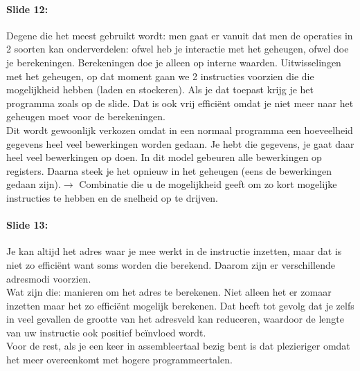 \documentclass[10pt,a4paper]{book}
\begin{document}
\paragraph{Slide 12:} Degene die het meest gebruikt wordt: men gaat er vanuit dat men de operaties in 2 soorten kan onderverdelen: ofwel heb je interactie met het geheugen, ofwel doe je berekeningen. Berekeningen doe je alleen op interne waarden. Uitwisselingen met het geheugen, op dat moment gaan we 2 instructies voorzien die die mogelijkheid hebben (laden en stockeren). Als je dat toepast krijg je het programma zoals op de slide. Dat is ook vrij effici\"ent omdat je niet meer naar het geheugen moet voor de berekeningen.\\
Dit wordt gewoonlijk verkozen omdat in een normaal programma een hoeveelheid gegevens heel veel bewerkingen worden gedaan. Je hebt die gegevens, je gaat daar heel veel bewerkingen op doen. In dit model gebeuren alle bewerkingen op registers. Daarna steek je het opnieuw in het geheugen (eens de bewerkingen gedaan zijn).$\rightarrow$ Combinatie die u de mogelijkheid geeft om zo kort mogelijke instructies te hebben en de snelheid op te drijven.

\paragraph{Slide 13:} Je kan altijd het adres waar je mee werkt in de instructie inzetten, maar dat is niet zo effici\"ent want soms worden die berekend. Daarom zijn er verschillende adresmodi voorzien.\\
Wat zijn die: manieren om het adres te berekenen. Niet alleen het er zomaar inzetten maar het zo effici\"ent mogelijk berekenen. Dat heeft tot gevolg dat je zelfs in veel gevallen de grootte van het adresveld kan reduceren, waardoor de lengte van uw instructie ook positief be\"invloed wordt.\\
Voor de rest, als je een keer in assembleertaal bezig bent is dat plezieriger omdat het meer overeenkomt met hogere programmeertalen. 
\end{document}
